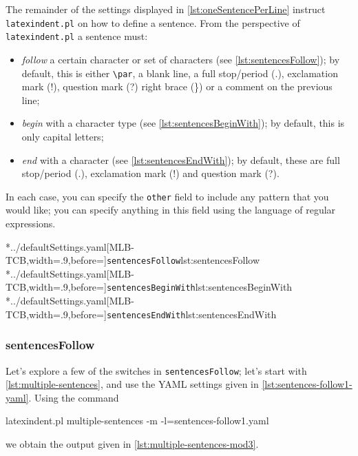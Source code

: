 	The remainder of the settings displayed in \vref{lst:oneSentencePerLine} instruct
	\texttt{latexindent.pl} on how to define a sentence. From the perspective of
	\texttt{latexindent.pl} a sentence must:
	\begin{itemize}
		\item \emph{follow} a certain character or set of characters (see
		      \cref{lst:sentencesFollow}); by default, this is either \lstinline!\par!, a
		      blank line, a full stop/period (.), exclamation mark (!), question mark (?) right brace
		      (\}) or a comment on the previous line;
		\item \emph{begin} with a character type (see \cref{lst:sentencesBeginWith}); by
		      default, this is only capital letters;
		\item \emph{end} with a character (see \cref{lst:sentencesEndWith}); by
		      default, these are full stop/period (.), exclamation mark (!) and question mark (?).
	\end{itemize}
	In each case, you can specify the \texttt{other} field to include any
	pattern that you would like; you can specify anything in this field using the language of
	regular expressions.

	\begin{cmhtcbraster}[raster columns=3,
			raster left skip=-3.5cm,
			raster right skip=-2cm,
			raster column skip=.06\linewidth]
		\cmhlistingsfromfile[style=sentencesFollow]*{../defaultSettings.yaml}[MLB-TCB,width=.9\linewidth,before=\centering]{\texttt{sentencesFollow}}{lst:sentencesFollow}
		\cmhlistingsfromfile[style=sentencesBeginWith]*{../defaultSettings.yaml}[MLB-TCB,width=.9\linewidth,before=\centering]{\texttt{sentencesBeginWith}}{lst:sentencesBeginWith}
		\cmhlistingsfromfile[style=sentencesEndWith]*{../defaultSettings.yaml}[MLB-TCB,width=.9\linewidth,before=\centering]{\texttt{sentencesEndWith}}{lst:sentencesEndWith}
	\end{cmhtcbraster}

\subsubsection{sentencesFollow}
	Let's explore a few of the switches in \texttt{sentencesFollow}; let's start with
	\vref{lst:multiple-sentences}, and use the YAML settings given in
	\cref{lst:sentences-follow1-yaml}. Using the command
	\begin{commandshell}
latexindent.pl multiple-sentences -m -l=sentences-follow1.yaml
\end{commandshell}
	we obtain the output given in \cref{lst:multiple-sentences-mod3}.

